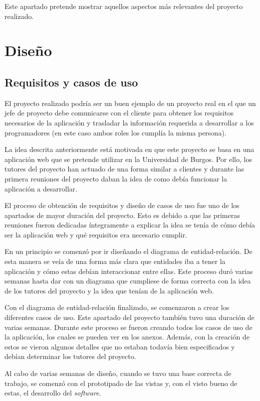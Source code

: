 
Este apartado pretende mostrar aquellos aspectos más relevantes del proyecto realizado.

\section{Diseño}
\subsection{Requisitos y casos de uso}
El proyecto realizado podría ser un buen ejemplo de un proyecto real en el que un jefe de proyecto debe comunicarse con el cliente para obtener los requisitos necesarios de la aplicación y trasladar la información requerida a desarrollar a los programadores (en este caso ambos roles los cumplía la misma persona).

La idea descrita anteriormente está motivada en que este proyecto se basa en una aplicación web que se pretende utilizar en la Universidad de Burgos. 
Por ello, los tutores del proyecto han actuado de una forma similar a clientes y durante las primera reuniones del proyecto daban la idea de como debía funcionar la aplicación a desarrollar.

El proceso de obtención de requisitos y diseño de casos de uso fue uno de los apartados de mayor duración del proyecto.
Esto es debido a que las primeras reuniones fueron dedicadas íntegramente a explicar la idea se tenía de cómo debía ser la aplicación web y qué requisitos era necesario cumplir.

En un principio se comenzó por ir diseñando el diagrama de entidad-relación.
De esta manera se veía de una forma más clara que entidades iba a tener la aplicación y cómo estas debían interaccionar entre ellas.
Este proceso duró varias semanas hasta dar con un diagrama que cumpliese de forma correcta con la idea de los tutores del proyecto y la idea que tenían de la aplicación web.

Con el diagrama de entidad-relación finalizado, se comenzaron a crear los diferentes casos de uso.
Este apartado del proyecto también tuvo una duración de varias semanas.
Durante este proceso se fueron creando todos los casos de uso de la aplicación, los cuales se pueden ver en los anexos.
Además, con la creación de estos se vieron algunos detalles que no estaban todavía bien especificados y debían determinar los tutores del proyecto.

Al cabo de varias semanas de diseño, cuando se tuvo una base correcta de trabajo, se comenzó con el prototipado de las vistas y, con el visto bueno de estas, el desarrollo del \textit{software}.

